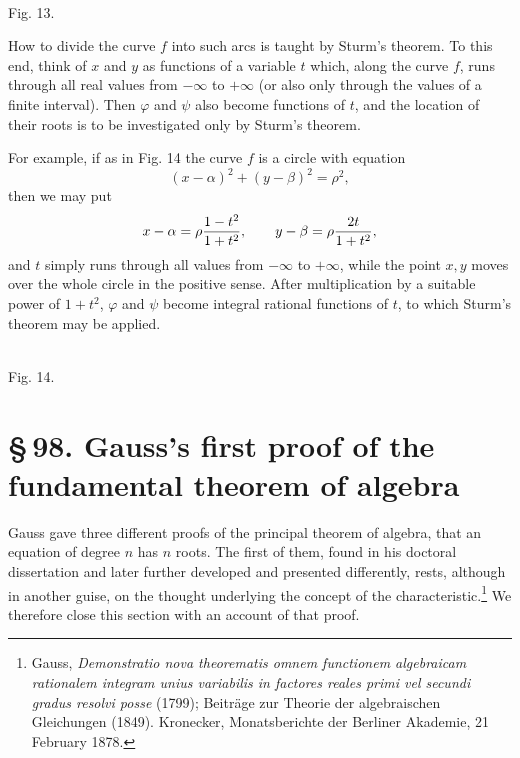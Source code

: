 \documentclass[11pt]{article}
\providecommand{\sect}[2]{\section*{\S\,#1. #2}}
\begin{document}
\begin{center}
\\[-0.2em]
{\small Fig. 13.}
\end{center}


How to divide the curve $f$ into such arcs is taught by Sturm's theorem. To this end, think of $x$ and $y$ as functions of a variable $t$ which, along the curve $f$, runs through all real values from $-\infty$ to $+\infty$ (or also only through the values of a finite interval). Then $\varphi$ and $\psi$ also become functions of $t$, and the location of their roots is to be investigated only by Sturm's theorem.

For example, if as in Fig. 14 the curve $f$ is a circle with equation
\[
        (x-\alpha)^2+(y-\beta)^2=\rho^2,
\]
then we may put
\[
        x-\alpha=\rho{1-t^2\over 1+t^2},
        \qquad
        y-\beta=\rho{2t\over 1+t^2},
\]
and $t$ simply runs through all values from $-\infty$ to $+\infty$, while the point $x,y$ moves over the whole circle in the positive sense. After multiplication by a suitable power of $1+t^2$, $\varphi$ and $\psi$ become integral rational functions of $t$, to which Sturm's theorem may be applied.


\begin{center}
\\[-0.2em]
{\small Fig. 14.}
\end{center}


\sect{98}{Gauss's first proof of the fundamental theorem of algebra}

Gauss gave three different proofs of the principal theorem of algebra, that an equation of degree $n$ has $n$ roots. The first of them, found in his doctoral dissertation and later further developed and presented differently, rests, although in another guise, on the thought underlying the concept of the characteristic.\footnote{Gauss, \emph{Demonstratio nova theorematis omnem functionem algebraicam rationalem integram unius variabilis in factores reales primi vel secundi gradus resolvi posse} (1799); Beiträge zur Theorie der algebraischen Gleichungen (1849). Kronecker, Monatsberichte der Berliner Akademie, 21 February 1878.} We therefore close this section with an account of that proof.
\end{document}
